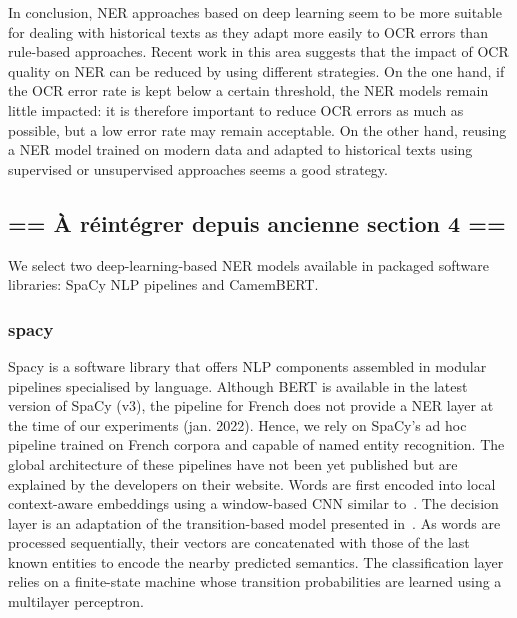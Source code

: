 In conclusion, NER approaches based on deep learning seem to be more suitable for dealing with historical texts as they adapt more easily to OCR errors than rule-based approaches.
Recent work in this area suggests that the impact of OCR quality on NER can be reduced by using different strategies.
On the one hand, if the OCR error rate is kept below a certain threshold, the NER models remain little impacted: it is therefore important to reduce OCR errors as much as possible, but a low error rate may remain acceptable.
On the other hand, reusing a NER model trained on modern data and adapted to historical texts using supervised or unsupervised approaches seems a good strategy. 




\subsection{== À réintégrer depuis ancienne section 4 ==}
We select two deep-learning-based NER models available in packaged software libraries: SpaCy NLP pipelines and CamemBERT.


\subsubsection{spacy}
Spacy is a software library that offers NLP components assembled in modular pipelines specialised by language.
Although BERT is available in the latest version of SpaCy (v3), the pipeline for French does not provide a NER layer at the time of our experiments (jan. 2022).
Hence, we rely on SpaCy's ad hoc pipeline trained on French corpora and capable of named entity recognition.
The global architecture of these pipelines have not been yet published but are explained by the developers on their website.
Words are first encoded into local context-aware embeddings using a window-based CNN similar to~\cite{collobert2011}.
The decision layer is an adaptation of the transition-based model presented in~\cite{lample2016}.
As words are processed sequentially, their vectors are concatenated with those of the last known entities to encode the nearby predicted semantics.
The classification layer relies on a finite-state machine whose transition probabilities are learned using a multilayer perceptron.



